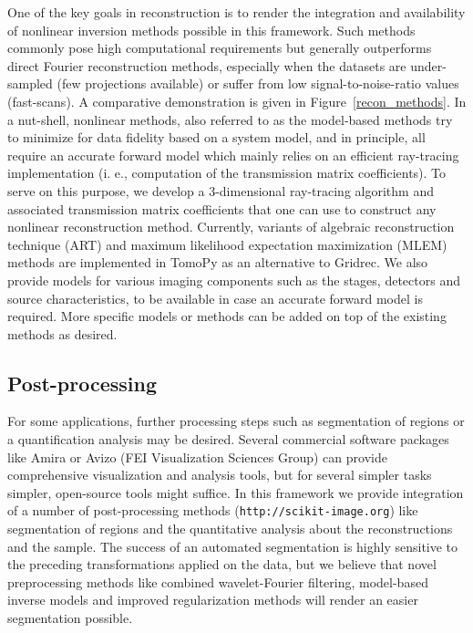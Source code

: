 \documentclass[pdf]{iucr}              %
\begin{document}
One of the key goals in reconstruction is to render the integration and availability of nonlinear inversion methods possible in this framework. Such methods commonly pose high computational requirements but generally outperforms direct Fourier reconstruction methods, especially when the datasets are under-sampled (few projections available) or suffer from low signal-to-noise-ratio values (fast-scans). A comparative demonstration is given in Figure~\ref{recon_methods}. In a nut-shell, nonlinear methods, also referred to as the model-based methods try to minimize for data fidelity based on a system model, and in principle, all require an accurate forward model which mainly relies on an efficient ray-tracing implementation (i. e., computation of the transmission matrix coefficients). To serve on this purpose, we develop a 3-dimensional ray-tracing algorithm and associated transmission matrix coefficients that one can use to construct any nonlinear reconstruction method. Currently, variants of algebraic reconstruction technique (ART) \cite{Gordon1970}  and maximum likelihood expectation maximization (MLEM) \cite{Dempster1977} methods are implemented in TomoPy as an alternative to Gridrec. We also provide models for various imaging components such as the stages, detectors and source characteristics, to be available in case an accurate forward model is required. More specific models or methods can be added on top of the existing methods as desired.

\subsection{Post-processing}

For some applications, further processing steps such as segmentation of regions or a quantification analysis may be desired. Several commercial software packages like Amira or Avizo (FEI Visualization Sciences Group) can provide comprehensive visualization and analysis tools, but for several simpler tasks simpler, open-source tools might suffice. In this framework we provide integration of a number of post-processing methods (\texttt{http://scikit-image.org}) like segmentation of regions and the quantitative analysis about the reconstructions and the sample. The success of an automated segmentation is highly sensitive to the preceding transformations applied on the data, but we believe that novel preprocessing methods like combined wavelet-Fourier filtering, model-based inverse models and improved regularization methods will render an easier segmentation possible. 
\end{document}
